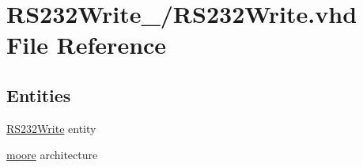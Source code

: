 \hypertarget{16_2_r_s232_write_8vhd}{}\section{R\+S232\+Write\+\_/\+R\+S232\+Write.vhd File Reference}
\label{16_2_r_s232_write_8vhd}
\subsection*{Entities}
\begin{DoxyCompactItemize}
\item 
\hyperlink{class_r_s232_write}{R\+S232\+Write} entity
\item 
\hyperlink{class_r_s232_write_1_1moore}{moore} architecture
\end{DoxyCompactItemize}
